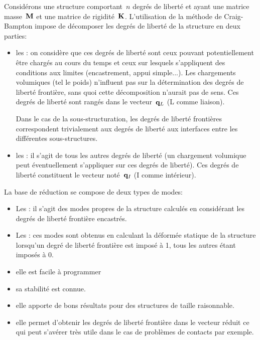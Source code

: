 Considérons une structure comportant~$n$ degrés de liberté et ayant une matrice masse~$\MM{M}$ et une matrice de rigidité~$\MM{K}$. L'utilisation de la méthode de Craig-Bampton impose de décomposer les degrés de liberté de la structure en deux parties:
\begin{itemize}
  \item les : on considère que ces degrés de liberté sont ceux pouvant potentiellement être chargés au cours du temps et ceux sur lesquels s'appliquent des conditions aux limites (encastrement, appui simple...). Les chargements volumiques (tel le poids) n'influent pas sur la détermination des degrés de liberté frontière, sans quoi cette décomposition n'aurait pas de sens. Ces degrés de liberté sont rangés dans le vecteur~$\VV{q}_L$ (L comme liaison).

	Dans le cas de la sous-structuration, les degrés de liberté frontières correspondent trivialement aux degrés de liberté aux interfaces entre les différentes sous-structures.
  \item les : il s'agit de tous les autres degrés de liberté (un chargement volumique peut éventuellement s'appliquer sur ces degrés de liberté). Ces degrés de liberté constituent le vecteur noté~$\VV{q}_I$ (I comme intérieur).
\end{itemize}
\medskipvm
La base de réduction se compose de deux types de modes:
\begin{itemize}
  \item Les : il s'agit des modes propres de la structure calculés en considérant les degrés de liberté frontière encastrés.
  \item Les : ces modes sont obtenus en calculant la déformée statique de la structure lorsqu'un degré de liberté frontière est imposé à 1, tous les autres étant imposés à 0.
\end{itemize}
\medskipvm
{}
\begin{itemize}
  \item elle est facile à programmer
  \item sa stabilité est connue.
  \item elle apporte de bons résultats pour des structures de taille raisonnable.
  \item elle permet d'obtenir les degrés de liberté frontière dans le vecteur réduit ce qui peut s'avérer très utile dans le cas de problèmes de contacts par exemple.
\end{itemize}
